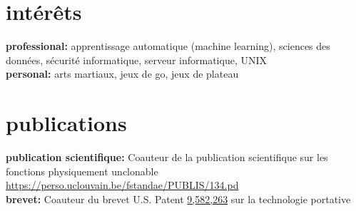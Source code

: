 \documentclass[]{friggeri-cv} %
\begin{document}
\section{intérêts}

\textbf{professional:} apprentissage automatique (machine learning), sciences
des données, sécurité informatique, serveur informatique, UNIX\\
\textbf{personal:} arts martiaux, jeux de go, jeux de plateau


\section{publications}

\textbf{publication scientifique:} Coauteur de la publication scientifique sur
les fonctions physiquement unclonable
\href{https://perso.uclouvain.be/fstandae/PUBLIS/134.pd}{https://perso.uclouvain.be/fstandae/PUBLIS/134.pd}
\\
\textbf{brevet:} Coauteur du brevet U.S. Patent
\href{http://patft.uspto.gov/netacgi/nph-Parser?Sect2=PTO1&Sect2=HITOFF&p=1&u=/netahtml/PTO/search-bool.html&r=1&f=G&l=50&d=PALL&RefSrch=yes&Query=PN/9582263}{9,582,263} sur la technologie portative

\end{document}
